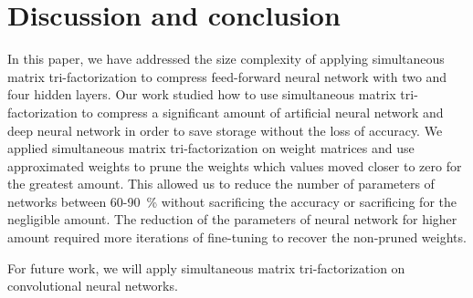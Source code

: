 \documentclass{article} %
\begin{document}
\section{Discussion and conclusion}
In this paper, we have addressed the size complexity of applying simultaneous 
matrix tri-factorization to compress feed-forward neural network with two and 
four hidden layers. Our work studied how to use simultaneous matrix 
tri-factorization to compress a significant amount of artificial neural network 
and deep neural network in order to save storage without the loss of accuracy. 
We applied simultaneous matrix tri-factorization on weight matrices and use 
approximated weights to prune the weights which values moved closer to zero for 
the greatest amount. This allowed us to reduce the number of parameters of 
networks between 60-90~\% without sacrificing the accuracy or sacrificing for 
the negligible amount. The reduction of the parameters of neural network for 
higher amount required more iterations of fine-tuning to recover the non-pruned 
weights. 

For future work, we will apply simultaneous matrix tri-factorization on 
convolutional neural networks.





\todos
\end{document}
